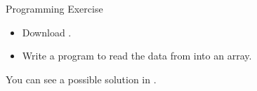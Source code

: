 \documentclass{beamer}
\begin{document}








\begin{frame}[fragile]{Programming Exercise}

\begin{itemize}
\item Download .
\item Write a program to read the data from  into an array.
\end{itemize}
You can see a possible solution in .
\end{frame}








\end{document}
